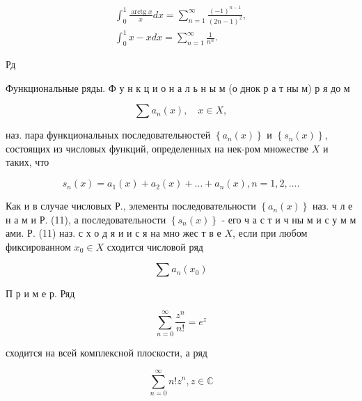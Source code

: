 \documentclass[10pt]{article}
\begin{document}
\[

\begin{gathered}

\int_{0}^{1} \frac{\operatorname{arctg} x}{x} d x=\sum_{n=1}^{\infty} \frac{(-1)^{n-1}}{(2 n-1)^{2}}, \\

\int_{0}^{1} x-x d x=\sum_{n=1}^{\infty} \frac{1}{n^{n}} .

\end{gathered}

\]



Рд



Функциональные ряды. Ф у н к ц и о н а л ь н ы м (о днок р а т ны м) р я до м



\[

\sum a_{n}(x), \quad x \in X,

\]



наз. пара функциональных последовательностей $\left\{a_{n}(x)\right\}$ и $\left\{s_{n}(x)\right\}$, состоящих из числовых функций, определенных на нек-ром множестве $X$ и таких, что



\[

s_{n}(x)=a_{1}(x)+a_{2}(x)+\ldots+a_{n}(x), n=1,2, \ldots .

\]



Как и в случае числовых Р., элементы последовательности $\left\{a_{n}(x)\right\}$ наз. ч л е н а м и Р. (11), а последовательности $\left\{s_{n}(x)\right\}$ - его ч а с т и ч ны м и с у м м ами. Р. (11) наз. с х о д я и и с я на мно жес т в е $X$, если при любом фиксированном $x_{0} \in X$ сходится числовой ряд



\[

\sum a_{n}\left(x_{0}\right)

\]



П р и м е р. Ряд



\[

\sum_{n=0}^{\infty} \frac{z^{n}}{n !}=e^{z}

\]



сходится на всей комплексной плоскости, а ряд



\[

\sum_{n=0}^{\infty} n ! z^{n}, z \in \mathbb{C}

\]
\end{document}
